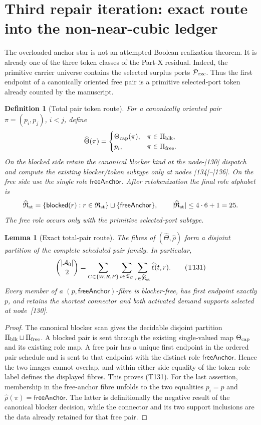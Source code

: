 \documentclass[11pt]{article}
\newtheorem{lemma}{Lemma}
\newtheorem{definition}{Definition}
\begin{document}
\section{Third repair iteration: exact route into the non-near-cubic ledger}

The overloaded anchor star is not an attempted Boolean-realization theorem.
It is already one of the three token classes of the Part-X residual.  Indeed,
the primitive carrier universe contains the selected surplus ports
\(\mathcal P_{\rm exc}\).  Thus the first endpoint of a canonically oriented
free pair is a primitive selected-port token already counted by the manuscript.

\begin{definition}[Total pair token route]
For a canonically oriented pair \(\pi=(p_i,p_j)\), \(i<j\), define
\[
 \widehat\Theta(\pi)=
 \begin{cases}
   \Theta_{\rm cap}(\pi),&\pi\in\Pi_{\rm blk},\\
   p_i,&\pi\in\Pi_{\rm free}.
 \end{cases}
\]
On the blocked side retain the canonical blocker kind at the node-[130]
dispatch and compute the existing blocker/token subtype only at nodes
[134]--[136].  On the free side use the single role
\(\mathsf{freeAnchor}\).  After retokenization the final role alphabet is
\[
 \widehat{\mathfrak R}_{\rm st}
 =\{\mathsf{blocked}(r):r\in\mathfrak R_{\rm st}\}
   \sqcup\{\mathsf{freeAnchor}\},
 \qquad |\widehat{\mathfrak R}_{\rm st}|\le4\cdot6+1=25.
\]
The free role occurs only with the primitive selected-port subtype.
\end{definition}

\begin{lemma}[Exact total-pair route]
The fibres of \((\widehat\Theta,\widehat\rho)\) form a disjoint partition of
the complete scheduled pair family.  In particular,
\[
 \binom{|\mathcal A_0|}{2}
 =\sum_{C\in\{W,R,P\}}
   \sum_{t\in\mathfrak T_C}
   \sum_{r\in\widehat{\mathfrak R}_{\rm st}}\widehat\ell(t,r).
 \tag{T131}
\]
Every member of a \((p,\mathsf{freeAnchor})\)-fibre is blocker-free, has
first endpoint exactly \(p\), and retains the shortest connector and both
activated demand supports selected at node~[130].
\end{lemma}

\begin{proof}
The canonical blocker scan gives the decidable disjoint partition
\(\Pi_{\rm blk}\sqcup\Pi_{\rm free}\).  A blocked pair is sent through the
existing single-valued map \(\Theta_{\rm cap}\) and its existing role map.  A
free pair has a unique first endpoint in the ordered pair schedule and is sent
to that endpoint with the distinct role \(\mathsf{freeAnchor}\).  Hence the
two images cannot overlap, and within either side equality of the token--role
label defines the displayed fibres.  This proves (T131).  For the last
assertion, membership in the free-anchor fibre unfolds to the two equalities
\(p_i=p\) and \(\widehat\rho(\pi)=\mathsf{freeAnchor}\).  The latter is
definitionally the negative result of the canonical blocker decision, while
the connector and its two support inclusions are the data already retained
for that free pair.
\end{proof}
\end{document}
